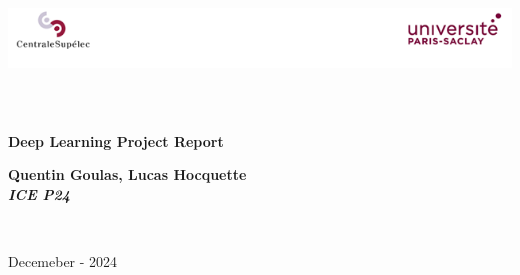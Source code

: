\begin{titlepage}
\begin{center}

\includegraphics[width=\textwidth]{./logo}~\\[1cm]


\textsc{\Large }\\[0.5cm]

\HRule \\[0.4cm]

{\huge \bfseries Deep Learning Project Report\\
[0.4cm] }

{\large \bfseries Quentin Goulas, Lucas Hocquette\\[0.4cm] }
{\large \bfseries \textit{ICE P24}\\[0.4cm] }


\HRule \\[1.5cm]

\vspace{3cm}

%


\vfill

{\large Decemeber - 2024}

\end{center}
\end{titlepage}